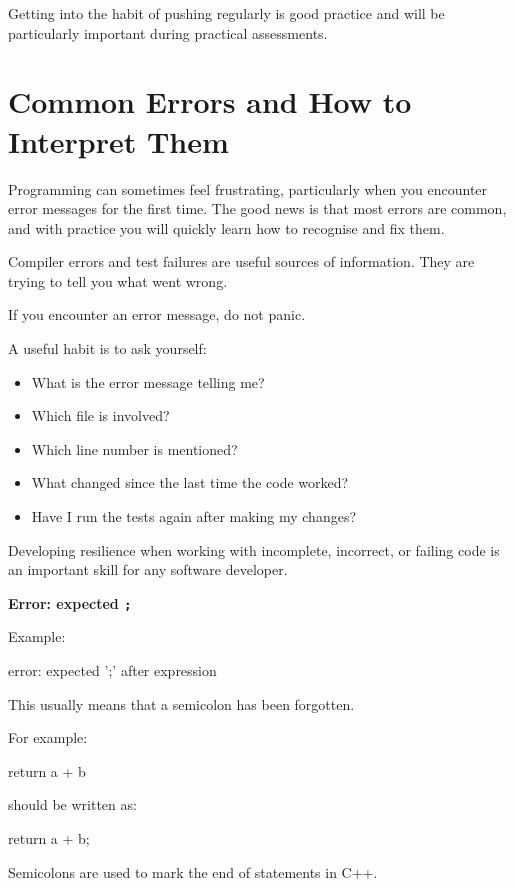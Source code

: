 \documentclass{csc2059practical}
\begin{document}
\begin{importantnote}
Getting into the habit of pushing regularly is good practice and will be particularly important during practical assessments.
\end{importantnote}

\section{Common Errors and How to Interpret Them}

Programming can sometimes feel frustrating, particularly when you encounter error messages for the first time. The good news is that most errors are common, and with practice you will quickly learn how to recognise and fix them.

Compiler errors and test failures are useful sources of information. They are trying to tell you what went wrong.

\begin{reflectionbox}
If you encounter an error message, do not panic.

A useful habit is to ask yourself:

\begin{itemize}
  \item What is the error message telling me?
  \item Which file is involved?
  \item Which line number is mentioned?
  \item What changed since the last time the code worked?
  \item Have I run the tests again after making my changes?
\end{itemize}

Developing resilience when working with incomplete, incorrect, or failing code is an important skill for any software developer.
\end{reflectionbox}

\begin{commonerror}
\textbf{Error: expected \texttt{;}}

Example:

\begin{terminal}
error: expected ';' after expression
\end{terminal}

This usually means that a semicolon has been forgotten.

For example:

\begin{cppcode}
return a + b
\end{cppcode}

should be written as:

\begin{cppcode}
return a + b;
\end{cppcode}

Semicolons are used to mark the end of statements in C++.
\end{commonerror}
\end{document}
